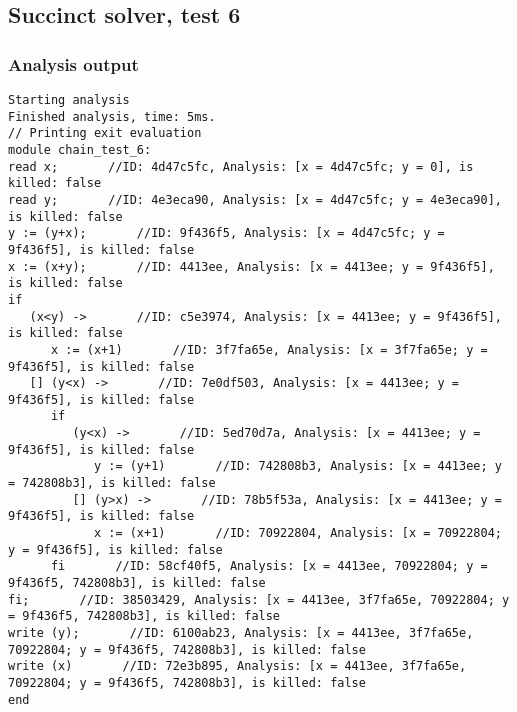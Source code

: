 \subsection{Succinct solver, test 6}
\subsubsection{Analysis output}
\begin{lstlisting}
Starting analysis
Finished analysis, time: 5ms.
// Printing exit evaluation
module chain_test_6:
read x;       //ID: 4d47c5fc, Analysis: [x = 4d47c5fc; y = 0], is killed: false
read y;       //ID: 4e3eca90, Analysis: [x = 4d47c5fc; y = 4e3eca90], is killed: false
y := (y+x);       //ID: 9f436f5, Analysis: [x = 4d47c5fc; y = 9f436f5], is killed: false
x := (x+y);       //ID: 4413ee, Analysis: [x = 4413ee; y = 9f436f5], is killed: false
if
   (x<y) ->       //ID: c5e3974, Analysis: [x = 4413ee; y = 9f436f5], is killed: false
      x := (x+1)       //ID: 3f7fa65e, Analysis: [x = 3f7fa65e; y = 9f436f5], is killed: false
   [] (y<x) ->       //ID: 7e0df503, Analysis: [x = 4413ee; y = 9f436f5], is killed: false
      if
         (y<x) ->       //ID: 5ed70d7a, Analysis: [x = 4413ee; y = 9f436f5], is killed: false
            y := (y+1)       //ID: 742808b3, Analysis: [x = 4413ee; y = 742808b3], is killed: false
         [] (y>x) ->       //ID: 78b5f53a, Analysis: [x = 4413ee; y = 9f436f5], is killed: false
            x := (x+1)       //ID: 70922804, Analysis: [x = 70922804; y = 9f436f5], is killed: false
      fi       //ID: 58cf40f5, Analysis: [x = 4413ee, 70922804; y = 9f436f5, 742808b3], is killed: false
fi;       //ID: 38503429, Analysis: [x = 4413ee, 3f7fa65e, 70922804; y = 9f436f5, 742808b3], is killed: false
write (y);       //ID: 6100ab23, Analysis: [x = 4413ee, 3f7fa65e, 70922804; y = 9f436f5, 742808b3], is killed: false
write (x)       //ID: 72e3b895, Analysis: [x = 4413ee, 3f7fa65e, 70922804; y = 9f436f5, 742808b3], is killed: false
end
\end{lstlisting}
